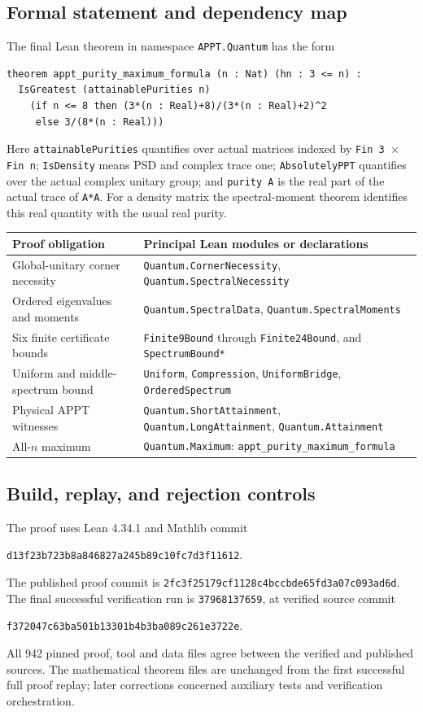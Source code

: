 \documentclass[11pt]{article}
\theoremstyle{remark}\newtheorem{remark}[theorem]{Remark}
\newcommand{\proofcommit}{\texttt{2fc3f25179cf1128c4bccbde65fd3a07c093ad6d}}
\begin{document}
\subsection{Formal statement and dependency map}
The final Lean theorem in namespace \texttt{APPT.Quantum} has the form
\begin{verbatim}
theorem appt_purity_maximum_formula (n : Nat) (hn : 3 <= n) :
  IsGreatest (attainablePurities n)
    (if n <= 8 then (3*(n : Real)+8)/(3*(n : Real)+2)^2
     else 3/(8*(n : Real)))
\end{verbatim}
Here \texttt{attainablePurities} quantifies over actual matrices indexed by \texttt{Fin 3 $\times$ Fin n}; \texttt{IsDensity} means PSD and complex trace one; \texttt{AbsolutelyPPT} quantifies over the actual complex unitary group; and \texttt{purity A} is the real part of the actual trace of \texttt{A*A}. For a density matrix the spectral-moment theorem identifies this real quantity with the usual real purity.

\begin{center}\small
\begin{tabular}{p{}p{}}
\toprule
Proof obligation&Principal Lean modules or declarations\\
\midrule
Global-unitary corner necessity&\texttt{Quantum.CornerNecessity}, \texttt{Quantum.SpectralNecessity}\\
Ordered eigenvalues and moments&\texttt{Quantum.SpectralData}, \texttt{Quantum.SpectralMoments}\\
Six finite certificate bounds&\texttt{Finite9Bound} through \texttt{Finite24Bound}, and \texttt{SpectrumBound*}\\
Uniform and middle-spectrum bound&\texttt{Uniform}, \texttt{Compression}, \texttt{UniformBridge}, \texttt{OrderedSpectrum}\\
Physical APPT witnesses&\texttt{Quantum.ShortAttainment}, \texttt{Quantum.LongAttainment}, \texttt{Quantum.Attainment}\\
All-$n$ maximum&\texttt{Quantum.Maximum}: \texttt{appt\_purity\_maximum\_formula}\\
\bottomrule
\end{tabular}
\end{center}

\subsection{Build, replay, and rejection controls}
The proof uses Lean 4.34.1 and Mathlib commit
\begin{center}\small\texttt{d13f23b723b8a846827a245b89c10fc7d3f11612}.
\end{center}
The published proof commit is \proofcommit. The final successful verification run is \texttt{37968137659}, at verified source commit
\begin{center}\small\texttt{f372047c63ba501b13301b4b3ba089c261e3722e}.
\end{center}
All 942 pinned proof, tool and data files agree between the verified and published sources. The mathematical theorem files are unchanged from the first successful full proof replay; later corrections concerned auxiliary tests and verification orchestration.
\end{document}
